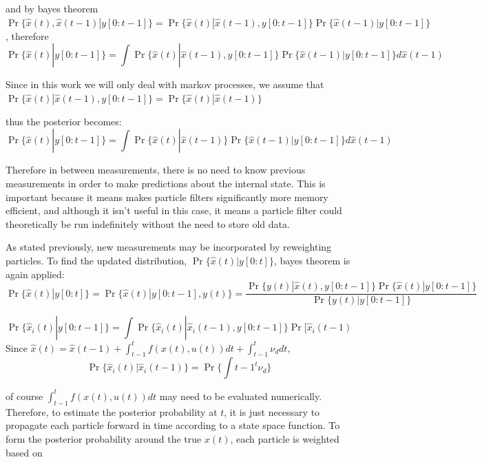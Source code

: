 \documentclass{article}
\begin{document}
and by bayes theorem $\Pr\{\hat{x}(t), \hat{x}(t-1) | y[0:t-1]\} = 
\Pr\{\hat{x}(t) | \hat{x}(t-1), y[0:t-1]\}\Pr\{\hat{x}(t-1) | y[0:t-1]\}$,
therefore 
\begin{equation}
\Pr\{\hat{x}(t) | y[0:t-1]\} =  \int \Pr\{\hat{x}(t) | \hat{x}(t-1) ,y[0:t-1]\}\Pr\{\hat{x}(t-1) | y[0:t-1]\}  d\hat{x}(t-1)
\end{equation}

Since in this work we will only deal with markov processes, we assume that 
$\Pr\{\hat{x}(t) | \hat{x}(t-1), y[0:t-1]\} = \Pr\{\hat{x}(t) | \hat{x}(t-1)\}$

thus the posterior becomes:
\begin{equation}
\Pr\{\hat{x}(t) | y[0:t-1]\} =  \int \Pr\{\hat{x}(t) | \hat{x}(t-1)\}\Pr\{\hat{x}(t-1) | y[0:t-1]\}  d\hat{x}(t-1)
\end{equation}

Therefore in between measurements, there is no need to know previous measurements in
order to make predictions about the internal state. This is important because it means makes
particle filters significantly more memory efficient, and although it isn't useful in this
case, it means a particle filter could theoretically be run indefinitely without the
need to store old data.

As stated previously, new measurements may be incorporated by reweighting particles.
To find the updated distribution, $\Pr\{\hat{x}(t) | y[0:t]\}$, bayes theorem is
again applied:
\begin{equation}
\Pr\{\hat{x}(t) | y[0:t]\} = \Pr\{\hat{x}(t) | y[0:t-1], y(t)\} = \frac{\Pr\{y(t) | \hat{x}(t), y[0:t-1]\}\Pr\{\hat{x}(t) | y[0:t-1]\}}
{\Pr\{y(t) | y[0:t-1]\}}
\end{equation}

\begin{equation}
\Pr\{\hat{x}_i(t) | y[0:t-1]\} = \int \Pr\{\hat{x}_i(t) | \hat{x}_i(t-1), y[0:t-1]\}\Pr[\hat{x}_i(t-1)
\end{equation}
Since $\hat{x}(t) = \hat{x}(t-1) + \int_{t-1}^t f(x(t), u(t))dt + \int_{t-1}^t\nu_d dt$, 
\begin{equation}
\Pr\{\hat{x}_i(t) | \hat{x}_i(t-1)\} = \Pr\{\int{t-1}^t \nu_d\}
\end{equation}

of course $\int_{t-1}^t f(x(t), u(t))dt$ may need to be evaluated numerically. Therefore,
to estimate the posterior probability at $t$, it is just necessary to propagate
each particle forward in time according to a state space function. To form 
the posterior probability around the true $x(t)$, each particle is weighted
based on 
\end{document}
